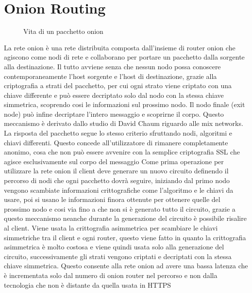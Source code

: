 \chapter{Onion Routing}
\label{chap:Capitolo1}

\begin{figure}[htpb!]
    \centering
    
    \caption{Vita di un pacchetto onion}
    \label{fig:routing}
\end{figure}

La rete onion è una rete distribuita composta dall'insieme di router onion che agiscono come nodi di rete e collaborano per portare un pacchetto dalla sorgente alla destinazione. Il tutto avviene senza che nessun nodo possa conoscere contemporaneamente l'host sorgente e l'host di destinazione, grazie alla criptografia a strati del pacchetto, per cui ogni strato viene criptato con una chiave differente e può essere decriptato solo dal nodo con la stessa chiave simmetrica, scoprendo cosi le informazioni sul prossimo nodo. Il nodo finale (exit node) può infine decriptare l'intero messaggio e scoprirne il corpo. Questo meccanismo è derivato dallo studio di David Chaum riguardo alle mix networks. La risposta del pacchetto segue lo stesso criterio sfruttando nodi, algoritmi e chiavi differenti. Questo concede all'utilizzatore di rimanere completamente anonimo, cosa che non può essere avvenire con la semplice criptografia SSL che agisce esclusivamente sul corpo del messaggio
Come prima operazione per utilizzare la rete onion il client deve generare un nuovo circuito definendo il percorso di nodi che ogni pacchetto dovrà seguire, iniziando dal primo nodo vengono scambiate informazioni crittografiche come l'algoritmo e le chiavi da usare, poi si usano le informazioni finora ottenute per ottenere quelle del prossimo nodo e cosi via fino a che non si è generato tutto il circuito, grazie a questo meccanismo neanche durante la generazione del circuito è possibile risalire al client. Viene usata la crittografia asimmetrica per scambiare le chiavi simmetriche tra il client e ogni router, questo viene fatto in quanto la crittografia asimmetrica è molto costosa e viene quindi usata solo alla generazione del circuito, successivamente gli strati vengono criptati e decriptati con la stessa chiave simmetrica. Questo consente alla rete onion ad avere una bassa latenza che è incrementata solo dal numero di onion router nel percorso e non dalla tecnologia che non è distante da quella usata in HTTPS



